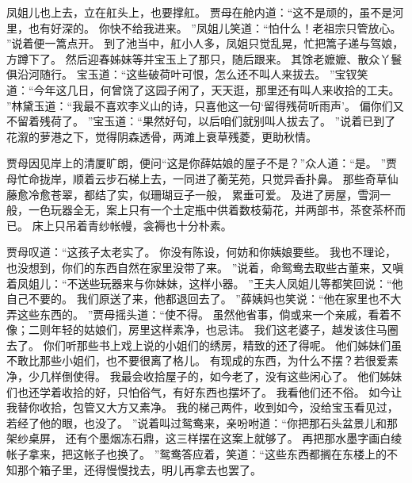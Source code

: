 凤姐儿也上去，立在舡头上，也要撑舡。
贾母在舱内道：“这不是顽的，虽不是河里，也有好深的。
你快不给我进来。
”凤姐儿笑道：“怕什么！老祖宗只管放心。
”说着便一篙点开。
到了池当中，舡小人多，凤姐只觉乱晃，忙把篙子递与驾娘，方蹲下了。
然后迎春姊妹等并宝玉上了那只，随后跟来。
其馀老嬷嬷、散众丫鬟俱沿河随行。
宝玉道：“这些破荷叶可恨，怎么还不叫人来拔去。
”宝钗笑道：“今年这几日，何曾饶了这园子闲了，天天逛，那里还有叫人来收拾的工夫。
”林黛玉道：“我最不喜欢李义山的诗，只喜他这一句‘留得残荷听雨声’。
偏你们又不留着残荷了。
”宝玉道：“果然好句，以后咱们就别叫人拔去了。
”说着已到了花溆的萝港之下，觉得阴森透骨，两滩上衰草残菱，更助秋情。
\par
贾母因见岸上的清厦旷朗，便问“这是你薛姑娘的屋子不是？”众人道：“是。
”贾母忙命拢岸，顺着云步石梯上去，一同进了蘅芜苑，只觉异香扑鼻。
那些奇草仙藤愈冷愈苍翠，都结了实，似珊瑚豆子一般，
累垂可爱。
及进了房屋，雪洞一般，一色玩器全无，案上只有一个土定瓶中供着数枝菊花，并两部书，茶奁茶杯而已。
床上只吊着青纱帐幔，衾褥也十分朴素。
\par
贾母叹道：“这孩子太老实了。
你没有陈设，何妨和你姨娘要些。
我也不理论，也没想到，你们的东西自然在家里没带了来。
”说着，命鸳鸯去取些古董来，又嗔着凤姐儿：“不送些玩器来与你妹妹，这样小器。
”王夫人凤姐儿等都笑回说：“他自己不要的。
我们原送了来，他都退回去了。
”薛姨妈也笑说：“他在家里也不大弄这些东西的。
”贾母摇头道：“使不得。
虽然他省事，倘或来一个亲戚，看着不像；二则年轻的姑娘们，房里这样素净，也忌讳。
我们这老婆子，越发该住马圈去了。
你们听那些书上戏上说的小姐们的绣房，精致的还了得呢。
他们姊妹们虽不敢比那些小姐们，也不要很离了格儿。
有现成的东西，为什么不摆？若很爱素净，少几样倒使得。
我最会收拾屋子的，如今老了，没有这些闲心了。
他们姊妹们也还学着收拾的好，只怕俗气，有好东西也摆坏了。
我看他们还不俗。
如今让我替你收拾，包管又大方又素净。
我的梯己两件，收到如今，没给宝玉看见过，若经了他的眼，也没了。
”说着叫过鸳鸯来，亲吩咐道：“你把那石头盆景儿和那架纱桌屏，
还有个墨烟冻石鼎，这三样摆在这案上就够了。
再把那水墨字画白绫帐子拿来，把这帐子也换了。
”鸳鸯答应着，笑道：“这些东西都搁在东楼上的不知那个箱子里，还得慢慢找去，明儿再拿去也罢了。
